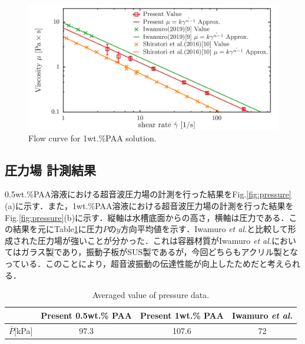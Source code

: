 \begin{figure}[ht]
    \centering
    \includegraphics[width=12cm,clip]{4-Results/PAA-viscosity.png}
    \caption{Flow curve for 1wt.\%PAA solution.}
    \label{fig:PAA-vis}
\end{figure}

\newpage

\subsection{圧力場 計測結果}

0.5wt.\%PAA溶液における超音波圧力場の計測を行った結果をFig.\ref{fig:pressure}(a)に示す．また，1wt.\%PAA溶液における超音波圧力場の計測を行った結果をFig.\ref{fig:pressure}(b)に示す．縦軸は水槽底面からの高さ，横軸は圧力である．この結果を元にTable\ref{table:press}に圧力$P$の$y$方向平均値を示す．Iwamuro {\it et al.}\cite{ref:8}と比較して形成された圧力場が強いことが分かった．これは容器材質がIwamuro {\it et al.}\cite{ref:8}においてはガラス製であり，振動子板がSUS製であるが，今回どちらもアクリル製となっている．このことにより，超音波振動の伝達性能が向上したためだと考えられる．

\begin{table}[h]
    \centering
    \caption{Averaged value of pressure data.}
    \label{table:press}
    \begin{tabular}{c|c|c|c}\hline
                       & Present 0.5wt.\% PAA & Present 1wt.\% PAA & Iwamuro {\it et al.}\cite{ref:8} \\ \hline
        $\bar{P}$[kPa] & 97.3                 & 107.6              & 72                               \\ \hline
    \end{tabular}
\end{table}

